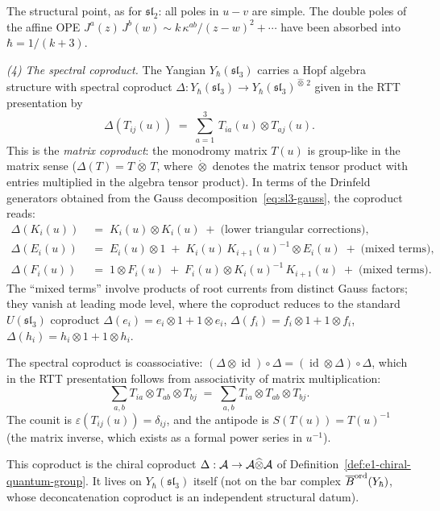 \begin{example}
The structural point, as for $\mathfrak{sl}_2$: all poles
in $u{-}v$ are simple. The double poles of the affine OPE
$J^a(z)\,J^b(w) \sim k\,\kappa^{ab}/(z{-}w)^2 + \cdots$
have been absorbed into $\hbar = 1/(k{+}3)$.

\medskip
\noindent\emph{(4) The spectral coproduct.}
The Yangian $Y_\hbar(\mathfrak{sl}_3)$ carries a Hopf algebra
structure with spectral coproduct
$\Delta : Y_\hbar(\mathfrak{sl}_3) \to
Y_\hbar(\mathfrak{sl}_3)^{\widehat\otimes\, 2}$ given in the
RTT presentation by
\begin{equation}\label{eq:sl3-coproduct-rtt}
\Delta(T_{ij}(u))
\;=\;
\sum_{a=1}^{3}\,T_{ia}(u)\otimes T_{aj}(u).
\end{equation}
This is the \emph{matrix coproduct}: the monodromy matrix
$T(u)$ is group-like in the matrix sense
($\Delta(T) = T\,\dot\otimes\,T$, where $\dot\otimes$ denotes
the matrix tensor product with entries multiplied in the
algebra tensor product). In terms of the Drinfeld generators
obtained from the Gauss decomposition~\eqref{eq:sl3-gauss},
the coproduct reads:
\begin{align}
\Delta(K_i(u))
&\;=\;
K_i(u)\otimes K_i(u)
\;+\;\text{(lower triangular corrections)},
\label{eq:sl3-coprod-K}\\[3pt]
\Delta(E_i(u))
&\;=\;
E_i(u)\otimes 1
\;+\;
K_i(u)\,K_{i+1}(u)^{-1}\otimes E_i(u)
\;+\;\text{(mixed terms)},
\label{eq:sl3-coprod-E}\\[3pt]
\Delta(F_i(u))
&\;=\;
1\otimes F_i(u)
\;+\;
F_i(u)\otimes K_i(u)^{-1}\,K_{i+1}(u)
\;+\;\text{(mixed terms)}.
\label{eq:sl3-coprod-F}
\end{align}
The ``mixed terms'' involve products of root currents
from distinct Gauss factors; they vanish at leading
mode level, where the coproduct reduces to the
standard $U(\mathfrak{sl}_3)$ coproduct
$\Delta(e_i) = e_i\otimes 1 + 1\otimes e_i$,
$\Delta(f_i) = f_i\otimes 1 + 1\otimes f_i$,
$\Delta(h_i) = h_i\otimes 1 + 1\otimes h_i$.

The spectral coproduct is coassociative:
$(\Delta\otimes\operatorname{id})\circ\Delta
= (\operatorname{id}\otimes\Delta)\circ\Delta$,
which in the RTT presentation follows from associativity of
matrix multiplication:
\[
\sum_{a,b}T_{ia}\otimes T_{ab}\otimes T_{bj}
\;=\;
\sum_{a,b}T_{ia}\otimes T_{ab}\otimes T_{bj}.
\]
The counit is $\varepsilon(T_{ij}(u)) = \delta_{ij}$,
and the antipode is $S(T(u)) = T(u)^{-1}$
(the matrix inverse, which exists as a formal power series
in $u^{-1}$).

This coproduct is the chiral coproduct
$\Delta: \mathcal{A}\to\mathcal{A}\widehat\otimes\mathcal{A}$ of
Definition~\ref{def:e1-chiral-quantum-group}.
It lives on $Y_\hbar(\mathfrak{sl}_3)$ itself (not on the
bar complex $\overline{B}^{\mathrm{ord}}(Y_\hbar)$, whose deconcatenation
coproduct is an independent structural datum).


\end{example}
